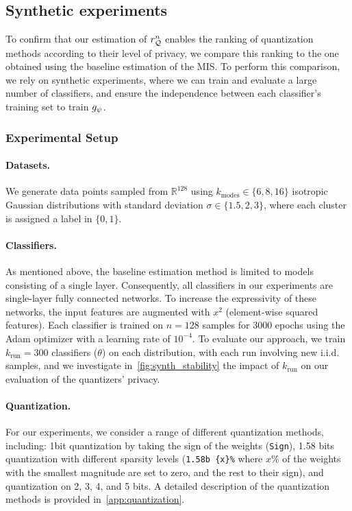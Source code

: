 \subsection{Synthetic experiments}
To confirm that our estimation of $r_{{\mathcal{Q}}}^n$ enables the ranking of quantization methods according to their level of privacy, we compare this ranking to the one obtained using the baseline estimation of the MIS.
To perform this comparison, we rely on synthetic experiments, where we can train and evaluate a large number of classifiers, and ensure the independence between each classifier's training set to train $g_\psi$.

\subsubsection{Experimental Setup}
\paragraph{Datasets.}
We generate data points sampled from $\mathbb{R}^{128}$ using $k_{\textrm{modes}} \in \{6,8,16\}$ isotropic Gaussian distributions with standard deviation $\sigma\in \{1.5,2,3\}$, where each cluster is assigned a label in $\{0,1\}$.

\paragraph{Classifiers.}
As mentioned above, the baseline estimation method is limited to models consisting of a single layer.
Consequently, all classifiers in our experiments are single-layer fully connected networks. 
To increase the expressivity of these networks, the input features are augmented with $x^2$ (element-wise squared features).
Each classifier is trained on $n=128$ samples for 3000 epochs using the Adam optimizer with a learning rate of $10^{-4}$.
To evaluate our approach, we train $k_{\textrm{run}}=300$ classifiers ($\theta$) on each distribution, with each run involving new i.i.d. samples, and we investigate in~\autoref{fig:synth_stability} the impact of $k_{\textrm{run}}$ on our evaluation of the quantizers' privacy.


\paragraph{Quantization.}
For our experiments, we consider a range of different quantization methods, including: 1bit quantization by taking the sign of the weights (\texttt{Sign}), 1.58 bits quantization with different sparsity levels (\texttt{1.58b \{x\}\%} where $x\%$ of the weights with the smallest magnitude are set to zero, and the rest to their sign), and quantization on 2, 3, 4, and 5 bits.
A detailed description of the quantization methods is provided in~\autoref{app:quantization}.


